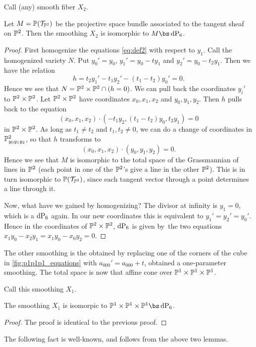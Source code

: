 Call (any) smooth fiber $X_2$. 

\begin{lemma}
Let $M=\P(\mathcal T_ {\P^2})$ be the projective space bundle associated to the tangent sheaf on $\P^2$. Then the smoothing $X_2$ is isomorphic to $M \bs \dP6$. 
\end{lemma}
\begin{proof}
First homogenize the equations \eqref{eq:def2} with respect to $y_1$. Call the homogenized variety $N$. Put $y_0'=y_0$, $y_1' = y_0-ty_1$ and $y_2'=y_0-t_2y_1$. Then we have the relation
\[
h = t_2y_1'-t_1y_2' - (t_1-t_2)y_0' = 0.
\]
Hence we see that $N=\P^2 \times \P^2 \cap (h = 0)$. We can pull back the coordinates $y_i'$ to $\P^2 \times \P^2$. Let $\P^2 \times \P^2$ have coordinates $x_0,x_1,x_2$ and $y_0,y_1,y_2$. Then $h$ pulls back to the equation
\[
(x_0,x_1,x_2) \cdot (-t_1y_2, (t_1-t_2)y_0,t_2y_1) = 0
\]
in $\P^2 \times \P^2$. As long as $t_1 \neq t_2$ and $t_1,t_2 \neq 0$, we can do a change of coordinates in $\P^2_{y_0y_1y_2}$, so that $h$ transforms to
\[
(x_0,x_1,x_2) \cdot(y_0,y_1,y_2) = 0.
\]
Hence we see that $M$ is isomorphic to the total space of the Grassmannian of lines in $\P^2$ (each point in one of the $\P^2$'s give a line in the other $\P^2$). This is in turn isomorphic to $\P(\mathcal T_{\P^2})$, since each tangent vector through a point determines a line through it.

Now, what have we gained by homogenizing? The divisor at infinity is $y_1=0$, which is a $\dP6$ again. In our new coordinates this is equivalent to $y_1'=y_2'=y_0'$. Hence in the coordinates of $\P^2 \times \P^2$, $\dP6$ is given by the two equations $x_1y_0-x_2y_1=x_1y_0-x_0y_2=0$. 
\end{proof}

The other smoothing is the obtained by replacing one of the corners of the cube in \cref{fig:p1p1p1_equations} with $a_{000}'=a_{000}+t$, obtained a one-parameter smoothing. The total space is now that affine cone over $\P^1 \times \P^1 \times \P^1$. 

Call this smoothing $X_1.$

\begin{lemma}
The smoothing $X_1$ is isomorpic to $\P^1 \times \P^1 \times \P^1 \bs \dP6$.
\end{lemma}
\begin{proof}
The proof is identical to the previous proof.
\end{proof}

The following fact is well-known, and follows from the above two lemmas.

